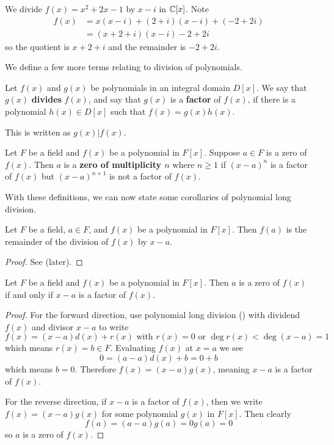 \begin{example}
    We divide $f(x) = x^2 + 2x - 1$ by $x-i$ in $\mathbb{C}[x]$. Note
    \begin{align*}
        f(x) &= x(x-i) + (2+i)(x-i) + (-2+2i)\\
        &= (x+2+i)(x-i) - 2 + 2i
    \end{align*}
    so the quotient is $x+2+i$ and the remainder is $-2+2i$.
\end{example}

We define a few more terms relating to division of polynomials.
\begin{definition}
    Let $f(x)$ and $g(x)$ be polynomials in an integral domain $D[x]$. We say that $g(x)$ \textbf{divides} $f(x)$, and say that $g(x)$ is a \textbf{factor} of $f(x)$, if there is a polynomial $h(x) \in D[x]$ such that $f(x) = g(x)h(x)$.

    This is written as $g(x) \vert f(x)$.
\end{definition}
\begin{definition}
    Let $F$ be a field and $f(x)$ be a polynomial in $F[x]$. Suppose $a \in F$ is a zero of $f(x)$. Then $a$ is a \textbf{zero of multiplicity $n$} where $n \geq 1$ if $(x-a)^n$ is a factor of $f(x)$ but $(x-a)^{n+1}$ is not a factor of $f(x)$.
\end{definition}

With these definitions, we can now state some corollaries of polynomial long division.

\begin{corollary}\label{corollary-remainder-theorem}
    Let $F$ be a field, $a \in F$, and $f(x)$ be a polynomial in $F[x]$. Then $f(a)$ is the remainder of the division of $f(x)$ by $x-a$.
\end{corollary}
\begin{proof}
    See  (later).
\end{proof}

\begin{corollary}\label{corollary-factor-theorem}
    Let $F$ be a field and $f(x)$ be a polynomial in $F[x]$. Then $a$ is a zero of $f(x)$ if and only if $x-a$ is a factor of $f(x)$.
\end{corollary}
\begin{proof}
    For the forward direction, use polynomial long division () with dividend $f(x)$ and divisor $x-a$ to write
    \[
        f(x) = (x-a)d(x) + r(x) \text{ with } r(x) = 0 \text{ or } \deg r(x) < \deg(x-a) = 1
    \]
    which means $r(x) = b \in F$. Evaluating $f(x)$ at $x = a$ we see
    \[
        0 = (a-a)d(x) + b = 0 + b
    \]
    which means $b = 0$. Therefore $f(x) = (x-a)g(x)$, meaning $x-a$ is a factor of $f(x)$.

    For the reverse direction, if $x - a$ is a factor of $f(x)$, then we write $f(x) = (x-a)g(x)$ for some polynomial $g(x)$ in $F[x]$. Then clearly
    \[
        f(a) = (a-a)g(a) = 0g(a) = 0
    \]
    so $a$ is a zero of $f(x)$.
\end{proof}

